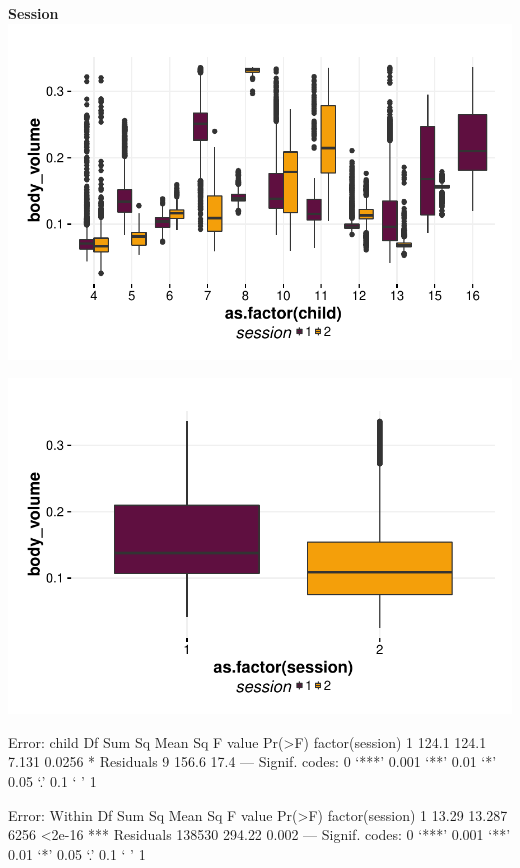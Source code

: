 \documentclass{article}
\begin{document}
\textbf{Session}
\includegraphics{features-plot_body_volume_child_session_quiz}

\includegraphics{features-plot_body_volume_session_quiz}

\begin{Schunk}
\begin{Soutput}
Error: child
                Df Sum Sq Mean Sq F value Pr(>F)  
factor(session)  1  124.1   124.1   7.131 0.0256 *
Residuals        9  156.6    17.4                 
---
Signif. codes:  0 ‘***’ 0.001 ‘**’ 0.01 ‘*’ 0.05 ‘.’ 0.1 ‘ ’ 1

Error: Within
                    Df Sum Sq Mean Sq F value Pr(>F)    
factor(session)      1  13.29  13.287    6256 <2e-16 ***
Residuals       138530 294.22   0.002                   
---
Signif. codes:  0 ‘***’ 0.001 ‘**’ 0.01 ‘*’ 0.05 ‘.’ 0.1 ‘ ’ 1
\end{Soutput}
\end{Schunk}
\end{document}
